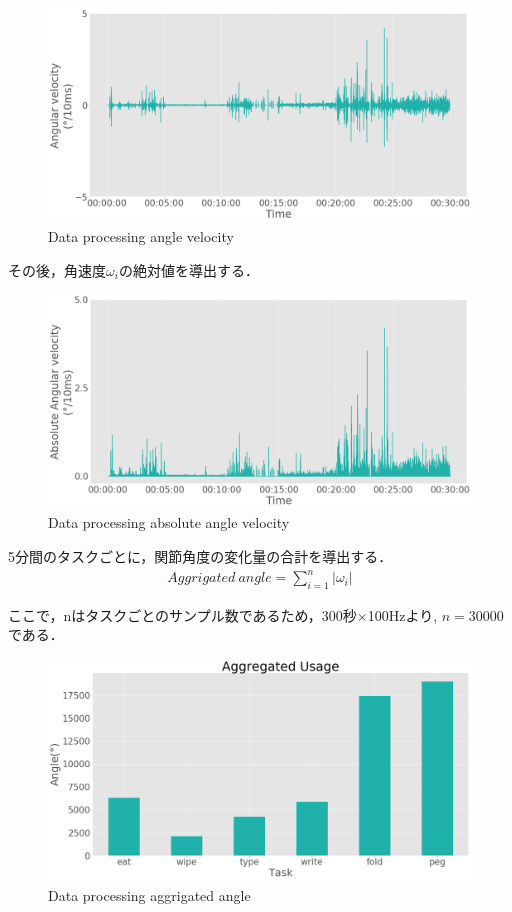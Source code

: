 \begin{figure}[H]
  \centering
  \includegraphics[width=0.8\linewidth]{fig/velocity}
  \caption{Data processing angle velocity}
  \label{fig:angle_velocity}
\end{figure}

その後，角速度$\omega_i$の絶対値を導出する．

\begin{figure}[H]
  \centering
  \includegraphics[width=0.8\linewidth]{fig/absolute_velocity}
  \caption{Data processing absolute angle velocity}
  \label{fig:abs_velocity}
\end{figure}

5分間のタスクごとに，関節角度の変化量の合計を導出する．
\begin{eqnarray}
Aggrigated\ angle  = \sum_{i=1}^n |\omega_i|
\end{eqnarray}

ここで，nはタスクごとのサンプル数であるため，300秒$\times$100Hzより,
$n=30000$である．

\begin{figure}[H]
  \centering
  \includegraphics[width=0.8\linewidth]{fig/aggrigated_angle}
  \caption{Data processing aggrigated angle}
  \label{fig:accel_xyz}
\end{figure}



